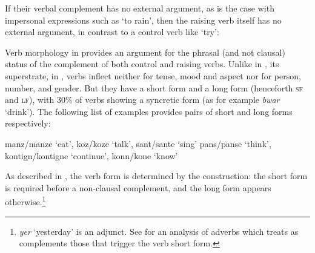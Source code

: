 \eal
{}
\zl
 
If their verbal complement has no external argument, as is the case with impersonal expressions such as  `to rain', then the raising verb itself has no external argument, in contrast to a control verb like  `try':

\eal
{}
\zl

Verb morphology in  provides an argument for the phrasal (and not clausal) status of the complement of both control and raising verbs. Unlike in , its superstrate, in ,  verbs inflect neither for tense, mood and aspect nor for person, number, and
gender. But they have a short form and a long form (henceforth \textsc{sf} and \textsc{lf}), with
30\% of verbs showing a syncretic form (as for example \emph{bwar} `drink'). The following list of examples provides pairs of short and
long forms respectively:

\eal
\ex manz/manze `eat', koz/koze `talk', sant/sante `sing'
\ex pans/panse `think', kontign/kontigne `continue', konn/kone `know'
\zl

\largerpage
As described in \citet[Chapter~4]{Henri2010}, the verb form is determined by the construction: the
short form is required before a non-clausal complement,
  and the long form appears otherwise.\footnote{\textit{yer} `yesterday' is an adjunct. See  for an analysis of  adverbs which treats as complements those that trigger the verb short form.}


